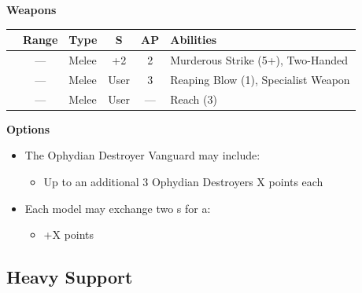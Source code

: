 \begin{minipage}[t]{0.72\textwidth}
	\vspace*{2em}
	\textbf{Weapons}
	
	\begin{tabular}{L{90 pt} c C{40pt} *{2}{c} >{\raggedright\arraybackslash}p{130pt}}
		& Range & Type & S & AP & Abilities \\
		\hline
		 & — & Melee & +2 & 2 & Murderous Strike (5+), Two-Handed \\
		 & — & Melee & User & 3 & Reaping Blow (1), Specialist Weapon \\
		 & — & Melee & User & — & Reach (3) \\
	\end{tabular}
	
	\vspace*{2em}
	\textbf{Options}
	\begin{itemize}
		\item The Ophydian Destroyer Vanguard may include:
		\begin{itemize}
			\item Up to an additional 3 Ophydian Destroyers \dotfill X points each
		\end{itemize}
		\item Each model may exchange two s for a:
		\begin{itemize}
			\item {} \dotfill +X points
		\end{itemize}
	\end{itemize}
\end{minipage}



\newpage
\subsection{Heavy Support}

\newpage
\subsubsection[Lokhust Destroyer Clave]{}

